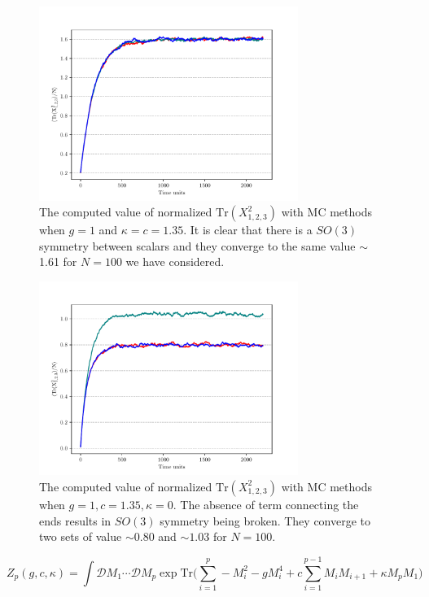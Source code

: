 \documentclass[11pt]{article}
\begin{document}
\begin{figure}[htbp] 
	\centering 
	\includegraphics[width=0.75\textwidth]{figs/plot_3MM_chain.pdf}
	\caption{\label{fig:F_app1}The computed value of normalized $\mbox{Tr}(X_{1,2,3}^2)$ with MC methods when $g=1$ and $\kappa=c=1.35$. It is clear that there is a $SO(3)$ symmetry between scalars and they converge to the same value $\sim$ 1.61 for $N = 100$ we have considered.}
\end{figure}

\begin{figure}[htbp] 
	\centering 
	\includegraphics[width=0.75\textwidth]{figs/open_3MMC.pdf}
	\caption{\label{fig:F_app1}The computed value of normalized $\mbox{Tr}(X_{1,2,3}^2)$ with MC methods when $g=1, c=1.35, \kappa=0$. The absence of term connecting the ends results in  $SO(3)$ symmetry being broken. They converge to two sets of value $\sim 0.80$ and $\sim 1.03$ for $N = 100$.}
\end{figure}


\begin{equation}
	\label{eq:Mehta1} 
	Z_{p}(g,c,\kappa) = \int \mathcal{D}M_{1} \cdots  \mathcal{D}M_{p} \exp \mbox{Tr} \Bigg(\sum_{i=1}^{p} -M_{i}^2  - g M_{i}^{4} + c \sum_{i=1}^{p-1} M_{i}M_{i+1} 
	+ \kappa M_{p}M_{1} \Bigg)
\end{equation}
\end{document}
